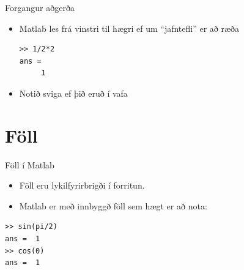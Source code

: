 \documentclass[handout]{beamer}
\begin{document}
\begin{frame}[fragile]{Forgangur aðgerða}
\begin{itemize}
 \item Matlab les frá vinstri til hægri ef um ``jafntefli'' er að ræða
\begin{verbatim}
>> 1/2*2
ans =
     1
\end{verbatim}
 \item Notið sviga ef þið eruð í vafa
\end{itemize}
\end{frame}


\section{Föll}


\begin{frame}[fragile]{Föll í Matlab}
\begin{itemize}
 \item Föll eru lykilfyrirbrigði í forritun.
 \item Matlab er með innbyggð föll sem hægt er að nota:
\end{itemize}
\begin{verbatim}
>> sin(pi/2)
ans =  1
>> cos(0)
ans =  1
\end{verbatim}
\end{frame}
\end{document}
